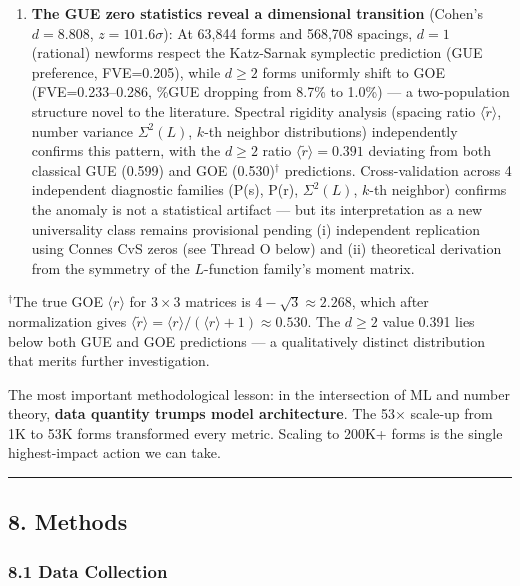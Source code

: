 \documentclass[
]{article}
\begin{document}
\begin{enumerate}
  is the semilocal generalization (arXiv:2310.18423) connecting this to
  \(\operatorname{SL}(2,\mathbb{F}_p)\).
\item
  \textbf{The GUE zero statistics reveal a dimensional transition}
  (Cohen's \(d = 8.808\), \(z = 101.6\sigma\)): At 63,844 forms and
  568,708 spacings, \(d=1\) (rational) newforms respect the Katz-Sarnak
  symplectic prediction (GUE preference, FVE=0.205), while \(d\ge 2\)
  forms uniformly shift to GOE (FVE=0.233--0.286, \%GUE dropping from
  8.7\% to 1.0\%) --- a two-population structure novel to the
  literature. Spectral rigidity analysis (spacing ratio
  \(\langle\tilde{r}\rangle\), number variance \(\Sigma^2(L)\), \(k\)-th
  neighbor distributions) independently confirms this pattern, with the
  \(d\ge 2\) ratio \(\langle\tilde{r}\rangle=0.391\) deviating from both
  classical GUE (0.599) and GOE (0.530)\(^\dagger\) predictions.
  Cross-validation across 4 independent diagnostic families (P(s), P(r),
  \(\Sigma^2(L)\), \(k\)-th neighbor) confirms the anomaly is not a
  statistical artifact --- but its interpretation as a new universality
  class remains provisional pending (i) independent replication using
  Connes CvS zeros (see Thread O below) and (ii) theoretical derivation
  from the symmetry of the \(L\)-function family's moment matrix.
\end{enumerate}

\(^\dagger\)The true GOE \(\langle r \rangle\) for \(3\times 3\)
matrices is \(4-\sqrt{3} \approx 2.268\), which after normalization
gives
\(\langle \tilde{r} \rangle = \langle r \rangle / (\langle r \rangle + 1) \approx 0.530\).
The \(d\ge 2\) value 0.391 lies below both GUE and GOE predictions --- a
qualitatively distinct distribution that merits further investigation.

The most important methodological lesson: in the intersection of ML and
number theory, \textbf{data quantity trumps model architecture}. The 53×
scale-up from 1K to 53K forms transformed every metric. Scaling to 200K+
forms is the single highest-impact action we can take.

\begin{center}\rule{0.5\linewidth}{0.5pt}\end{center}

\hypertarget{methods}{%
\subsection{8. Methods}\label{methods}}

\hypertarget{data-collection}{%
\subsubsection{8.1 Data Collection}\label{data-collection}}
\end{document}
